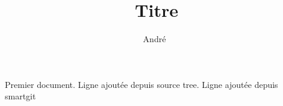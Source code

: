 \documentclass[a4paper, french, 12pt]{article}
\title{Titre}
\author{André~\bsc{Dewèvre}}
\date{}
\begin{document}
\maketitle

Premier document.
Ligne ajoutée depuis source tree.
Ligne ajoutée depuis smartgit
\end{document}
